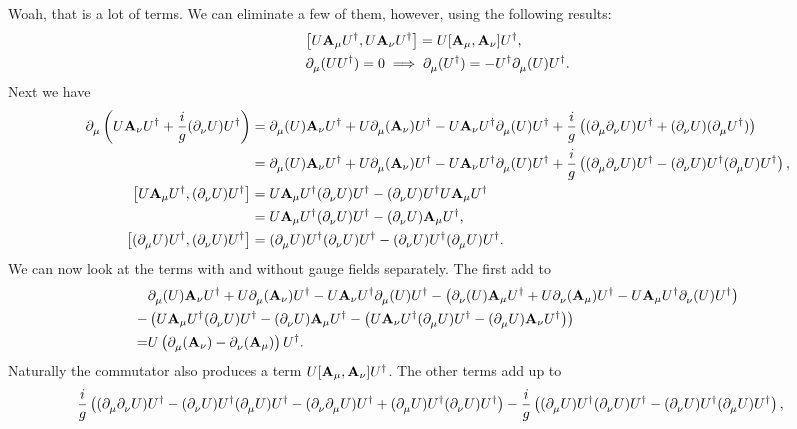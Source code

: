 Woah, that is a lot of terms. We can eliminate a few of them, however, using the following results:
\begin{align*}
	&\comm{U\textbf{A}_{\mu}U\adj}{U\textbf{A}_{\nu}U\adj} = U\comm{\textbf{A}_{\mu}}{\textbf{A}_{\nu}}U\adj, \\
	&\del{}{\mu}(UU\adj) = 0 \implies \del{}{\mu}(U\adj) = -U\adj\del{}{\mu}(U)U\adj.
\end{align*}
Next we have
\begin{align*}
	\del{}{\mu}\left(U\textbf{A}_{\nu}U\adj + \frac{i}{g}(\del{}{\nu}U)U\adj\right) &= \del{}{\mu}(U)\textbf{A}_{\nu}U\adj + U\del{}{\mu}(\textbf{A}_{\nu})U\adj - U\textbf{A}_{\nu}U\adj\del{}{\mu}(U)U\adj + \frac{i}{g}\left((\del{}{\mu}\del{}{\nu}U)U\adj + (\del{}{\nu}U)(\del{}{\mu}U\adj)\right) \\
	&= \del{}{\mu}(U)\textbf{A}_{\nu}U\adj + U\del{}{\mu}(\textbf{A}_{\nu})U\adj - U\textbf{A}_{\nu}U\adj\del{}{\mu}(U)U\adj + \frac{i}{g}\left((\del{}{\mu}\del{}{\nu}U)U\adj - (\del{}{\nu}U)U\adj(\del{}{\mu}U)U\adj\right), \\
	\comm{U\textbf{A}_{\mu}U\adj}{(\del{}{\nu}U)U\adj} &= U\textbf{A}_{\mu}U\adj(\del{}{\nu}U)U\adj - (\del{}{\nu}U)U\adj U\textbf{A}_{\mu}U\adj \\
	&= U\textbf{A}_{\mu}U\adj(\del{}{\nu}U)U\adj - (\del{}{\nu}U)\textbf{A}_{\mu}U\adj, \\
	\comm{(\del{}{\mu}U)U\adj}{(\del{}{\nu}U)U\adj} &= (\del{}{\mu}U)U\adj(\del{}{\nu}U)U\adj - (\del{}{\nu}U)U\adj(\del{}{\mu}U)U\adj.
\end{align*}
We can now look at the terms with and without gauge fields separately. The first add to
\begin{align*}
	 &\partial^{}_{\mu}(U)\textbf{A}_{\nu}U^{\dagger} + U\partial^{}_{\mu}(\textbf{A}_{\nu})U^{\dagger} - U\textbf{A}_{\nu}U^{\dagger}\partial^{}_{\mu}(U)U^{\dagger} - \left(\partial^{}_{\nu}(U)\textbf{A}_{\mu}U^{\dagger} + U\partial^{}_{\nu}(\textbf{A}_{\mu})U^{\dagger} - U\textbf{A}_{\mu}U^{\dagger}\partial^{}_{\nu}(U)U^{\dagger}\right) \\
	-& \left(U\textbf{A}_{\mu}U^{\dagger}(\partial^{}_{\nu}U)U^{\dagger} - (\partial^{}_{\nu}U)\textbf{A}_{\mu}U^{\dagger} - \left(U\textbf{A}_{\nu}U^{\dagger}(\partial^{}_{\mu}U)U^{\dagger} - (\partial^{}_{\mu}U)\textbf{A}_{\nu}U^{\dagger}\right)\right) \\
	=& U\left(\partial^{}_{\mu}(\textbf{A}_{\nu}) - \partial^{}_{\nu}(\textbf{A}_{\mu})\right)U^{\dagger}.
\end{align*}
Naturally the commutator also produces a term $U\comm{\textbf{A}_{\mu}}{\textbf{A}_{\nu}}U\adj$. The other terms add up to 
\begin{align*}
	&\frac{i}{g}\left((\partial^{}_{\mu}\partial^{}_{\nu}U)U^{\dagger} - (\partial^{}_{\nu}U)U^{\dagger}(\partial^{}_{\mu}U)U^{\dagger} - (\partial^{}_{\nu}\partial^{}_{\mu}U)U^{\dagger} + (\partial^{}_{\mu}U)U^{\dagger}(\partial^{}_{\nu}U)U^{\dagger}\right) - \frac{i}{g}\left((\partial^{}_{\mu}U)U^{\dagger}(\partial^{}_{\nu}U)U^{\dagger} - (\partial^{}_{\nu}U)U^{\dagger}(\partial^{}_{\mu}U)U^{\dagger}\right),
\end{align*}
